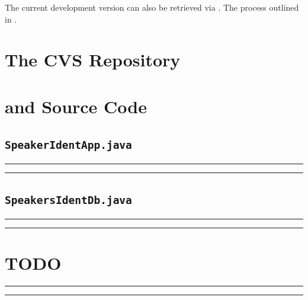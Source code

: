 The current development version can also be retrieved via . The
process outlined in .

\clearpage


\chapter{The CVS Repository}
\label{appx:cvs}




\chapter{ and  Source Code}

\section{\texttt{SpeakerIdentApp.java}}

\vspace{15pt}
\hrule
{\scriptsize }
\hrule
\vspace{15pt}

\section{\texttt{SpeakersIdentDb.java}}

\vspace{15pt}
\hrule
{\scriptsize }
\hrule
\vspace{15pt}

\clearpage


\chapter{TODO}
\label{appx:todo}

\vspace{15pt}
\hrule
{\scriptsize }
\hrule
\vspace{15pt}

